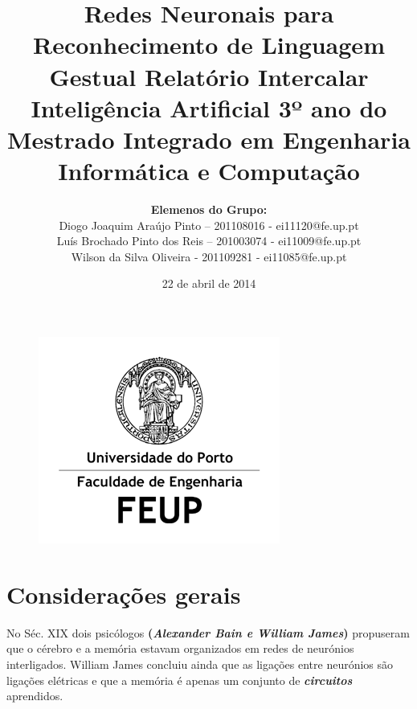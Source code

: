 \documentclass[10pt,a4paper]{article}
\begin{document}
\begin{figure}
\centering
\includegraphics[width=0.7\linewidth]{./LogoFeup}
\end{figure}

\title{\Huge\textbf{Redes Neuronais para Reconhecimento de Linguagem Gestual}\linebreak\linebreak\linebreak
\Large\textbf{Relatório Intercalar}\linebreak\linebreak
\Large{Inteligência Artificial}\linebreak
\Large{3º ano do Mestrado Integrado em Engenharia Informática e Computação} \linebreak \linebreak}

\author{\textbf{Elemenos do Grupo:}\\ Diogo Joaquim Araújo Pinto – 201108016 - ei11120@fe.up.pt \\ Luís Brochado Pinto dos Reis – 201003074 - ei11009@fe.up.pt \\ Wilson da Silva Oliveira - 201109281 - ei11085@fe.up.pt}
\date{22 de abril de 2014}
\maketitle

\tableofcontents
\newpage
\section{Considerações gerais}
No Séc. XIX dois psicólogos \textbf{(\textit{Alexander Bain e William James})} propuseram que o cérebro e a memória estavam organizados em redes de neurónios interligados. William James concluiu ainda que as ligações entre neurónios são ligações elétricas e que a memória é apenas um conjunto de \textbf{\textit{circuitos}} aprendidos.
\end{document}
